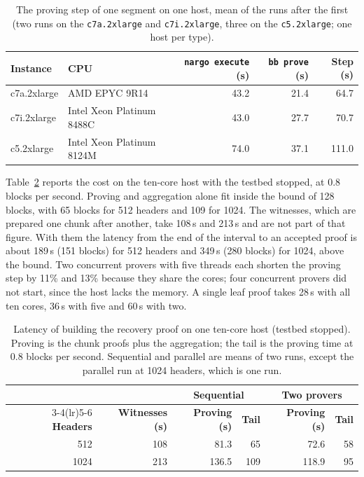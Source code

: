 \begin{table}[tbp]
\caption{The proving step of one segment on one host, mean of the runs after the first (two runs on the
\texttt{c7a.2xlarge} and \texttt{c7i.2xlarge}, three on the \texttt{c5.2xlarge}; one host per type).}
\label{tab:instances}
\centering
\footnotesize
\begin{tabular}{@{}llrrr@{}}
\toprule
\textbf{Instance} & \textbf{CPU} & \textbf{\texttt{nargo execute} (s)} & \textbf{\texttt{bb prove} (s)} & \textbf{Step (s)} \\
\midrule
c7a.2xlarge & AMD EPYC 9R14 & 43.2 & 21.4 & 64.7 \\
c7i.2xlarge & Intel Xeon Platinum 8488C & 43.0 & 27.7 & 70.7 \\
c5.2xlarge & Intel Xeon Platinum 8124M & 74.0 & 37.1 & 111.0 \\
\bottomrule
\end{tabular}
\end{table}

Table~\ref{tab:parallel} reports the cost on the ten-core host with the testbed
stopped, at 0.8 blocks per second. Proving and aggregation alone fit inside the bound
of 128 blocks, with 65 blocks for 512 headers and 109 for 1024. The witnesses, which
are prepared one chunk after another, take 108\,s and 213\,s and are not part of that
figure. With them the latency from the end of the interval to an accepted proof is
about 189\,s (151 blocks) for 512 headers and 349\,s (280 blocks) for 1024, above the
bound. Two concurrent provers with five threads each shorten the proving step by 11\%
and 13\% because they share the cores; four concurrent provers did not start, since the
host lacks the memory. A single leaf proof takes 28\,s with all ten cores, 36\,s with
five and 60\,s with two.

\begin{table}[tbp]
\caption{Latency of building the recovery proof on one ten-core host (testbed
stopped). Proving is the chunk proofs plus the aggregation; the tail is the proving
time at 0.8 blocks per second. Sequential and parallel are means of two runs, except
the parallel run at 1024 headers, which is one run.}
\label{tab:parallel}
\centering
\footnotesize
\begin{tabular}{@{}rrrrrr@{}}
\toprule
 & & \multicolumn{2}{c}{\textbf{Sequential}} & \multicolumn{2}{c}{\textbf{Two provers}} \\
\cmidrule(lr){3-4}\cmidrule(lr){5-6}
\textbf{Headers} & \textbf{Witnesses (s)} & \textbf{Proving (s)} & \textbf{Tail} & \textbf{Proving (s)} & \textbf{Tail} \\
\midrule
512  & 108 & 81.3  & 65  & 72.6  & 58 \\
1024 & 213 & 136.5 & 109 & 118.9 & 95 \\
\bottomrule
\end{tabular}
\end{table}

